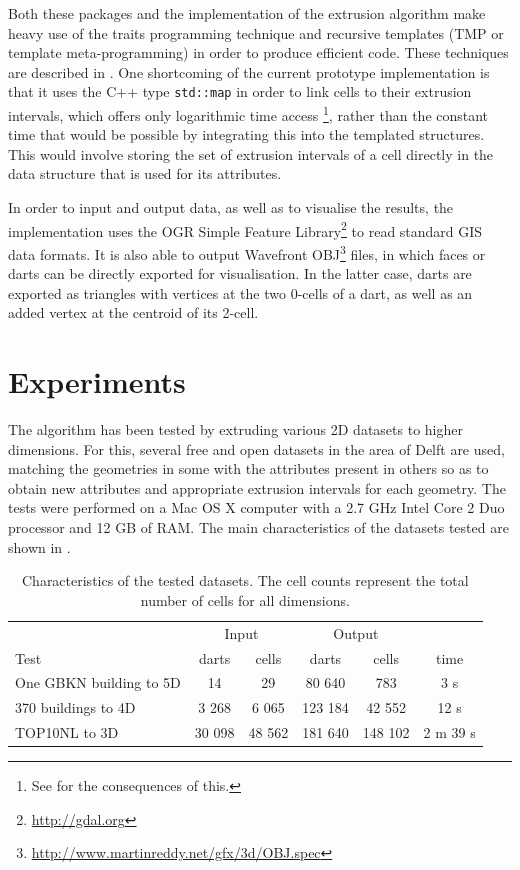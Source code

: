 Both these packages and the implementation of the extrusion algorithm make heavy use of the traits programming technique \citep{Myers95} and recursive templates (TMP or template meta-programming) in order to produce efficient code.
These techniques are described in .
One shortcoming of the current prototype implementation is that it uses the C++ type \texttt{std::map} in order to link cells to their extrusion intervals, which offers only logarithmic time access \citep[\S{}23.4]{ISO14882:2015}\footnote{See \citet{Austern00} for the consequences of this.}, rather than the constant time that would be possible by integrating this into the templated structures.
This would involve storing the set of extrusion intervals of a cell directly in the data structure that is used for its attributes.

In order to input and output data, as well as to visualise the results, the implementation uses the OGR Simple Feature Library\footnote{\url{http://gdal.org}} to read standard GIS data formats.
It is also able to output Wavefront OBJ\footnote{\url{http://www.martinreddy.net/gfx/3d/OBJ.spec}} files, in which faces or darts can be directly exported for visualisation.
In the latter case, darts are exported as triangles with vertices at the two 0-cells of a dart, as well as an added vertex at the centroid of its 2-cell.

\section{Experiments}
\label{se:extrusion-experiments}

The algorithm has been tested by extruding various 2D datasets to higher dimensions.
For this, several free and open datasets in the area of Delft are used, matching the geometries in some with the attributes present in others so as to obtain new attributes and appropriate extrusion intervals for each geometry.
The tests were performed on a Mac OS X computer with a 2.7 GHz Intel Core 2 Duo processor and 12 GB of RAM.\@
The main characteristics of the datasets tested are shown in .

\begin{table}[tbp]
\caption[Extrusion test results]{Characteristics of the tested datasets. The cell counts represent the total number of cells for all dimensions.}
\centering
\small
\begin{tabular}{lccccc}
\toprule
& \multicolumn{2}{c}{Input} & \multicolumn{2}{c}{Output} & \\
\cmidrule(lr){2-3}
\cmidrule(lr){4-5}
Test & darts & cells & darts & cells & time \\
\midrule
One GBKN building to 5D & 14 & 29 & 80 640 & 783 & 3 s \\
370 buildings to 4D & 3 268 & 6 065 & 123 184 & 42 552 & 12 s \\
TOP10NL to 3D & 30 098 & 48 562 & 181 640 & 148 102 & 2 m 39 s\\
\bottomrule
\end{tabular}
\label{table:tests}
\end{table}

